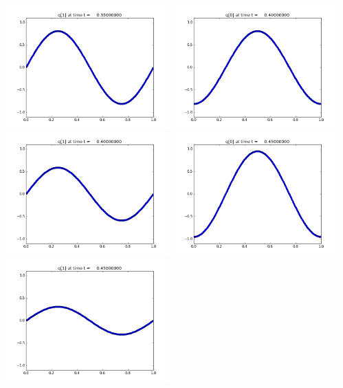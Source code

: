 \documentclass[11pt]{article}
\begin{document}
\includegraphics[width=0.475\textwidth]{frame0007fig1.png}
\vskip 10pt 
\includegraphics[width=0.475\textwidth]{frame0008fig0.png}
\includegraphics[width=0.475\textwidth]{frame0008fig1.png}
\vskip 10pt 
\includegraphics[width=0.475\textwidth]{frame0009fig0.png}
\includegraphics[width=0.475\textwidth]{frame0009fig1.png}
\end{document}
